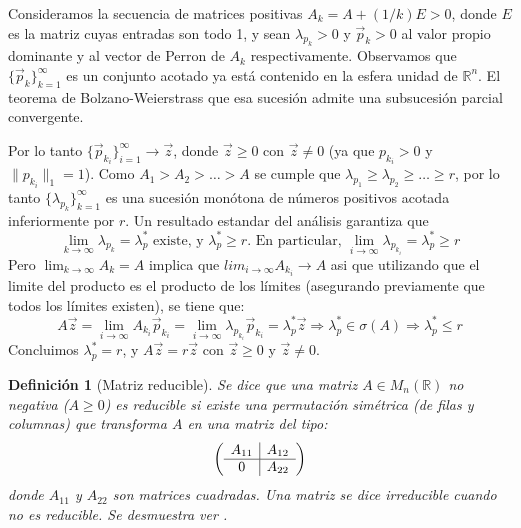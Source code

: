 \documentclass[size=a4, parskip=half, titlepage=false, toc=flat, toc=bib, 12pt]{scrartcl}
\makeatletter
\renewenvironment{proof}[1][\proofname] {\par\pushQED{\qed}\normalfont\topsep6\p@\@plus6\p@\relax\trivlist\item[\hskip\labelsep\itshape\tgpaella#1\@addpunct{.}]\ignorespaces}{\popQED\endtrivlist\@endpefalse}
\theoremstyle{theorem-style}
\theoremstyle{definition-style}
\newtheorem{ndef}{Definición}[section]
\theoremstyle{remark-style}
\theoremstyle{example-style}
\theoremstyle{definition-style}
\theoremstyle{remark-style}
\renewcommand{\proofname}{\normalfont\tgpaella\bfseries\small DEMOSTRACIÓN}
\makeatother
\begin{document}
\begin{proof}
Consideramos la secuencia de matrices positivas $A_k = A + (1/k)E > 0$, donde $E$ es la matriz cuyas entradas son todo 1, y sean $\lambda_{p_k} >0$ y $\vec{p}_k >0$ al valor propio dominante y al vector de Perron de $A_k$ respectivamente. Observamos que $\{\vec{p}_k\}_{k=1}^{\infty}$ es un conjunto acotado ya está contenido en la esfera unidad de $\mathbb{R}^n$. El teorema de Bolzano-Weierstrass que esa sucesión admite una subsucesión parcial convergente.

Por lo tanto $\{\vec{p}_{k_i}\}_{i = 1}^{\infty} \rightarrow \vec{z}$, donde $\vec{z} \geq 0$ con $\vec{z} \neq 0$ (ya que $p_{k_i} > 0$ y $\|p_{k_i} \|_1 = 1$). Como $A_1 > A_2 > \dots > A$ se cumple que $\lambda_{p_1} \geq \lambda_{p_2} \geq \dots \geq r $, por lo tanto $\{\lambda_{p_k}\}_{k = 1}^{\infty}$ es una sucesión monótona de números positivos acotada inferiormente por $r$. Un resultado estandar del análisis garantiza que
$$\lim_{k \to \infty} \lambda_{p_k} = \lambda_p^* \textrm{ existe, y } \lambda_p^* \geq r \textrm{. En particular, } \lim_{i \to \infty} \lambda_{p_{k_i}} = \lambda_p^* \geq r$$
Pero $\lim_{k \to \infty} A_k = A$ implica que $lim_{i \to \infty} A_{k_i} \rightarrow A$ asi que utilizando que el limite del producto es el producto de los límites (asegurando previamente que todos los límites existen), se tiene que:
$$A \vec{z} = \lim_{i \to \infty} A_{k_i} \vec{p}_k_i = \lim_{i \to \infty} \lambda_{p_{k_i}} \vec{p}_{k_i} = \lambda_p^* \vec{z}  \Rightarrow \lambda_p^* \in \sigma(A) \Rightarrow \lambda_p^* \leq r$$
Concluimos $\lambda_p^* = r$, y $A \vec{z} = r \vec{z}$ con $\vec{z} \geq 0$ y $\vec{z} \neq 0$.
\end{proof}

\begin{ndef}[Matriz reducible]
Se dice que una matriz $A \in M_n(\mathbb{R})$ no negativa ($A \geq 0$) es reducible si existe una permutación simétrica (de filas y columnas) que transforma $A$ en una matriz del tipo:
$$\left(
      \begin{array}{{c|c}}
            A_{11}    &    A_{12}  \\\hline
            0         &    A_{22}     \\
      \end{array}   \right)$$
donde $A_{11}$ y $A_{22}$ son matrices cuadradas. Una matriz se dice irreducible cuando no es reducible. Se desmuestra ver \cite{algebralineal}.
\end{ndef}
\end{document}
